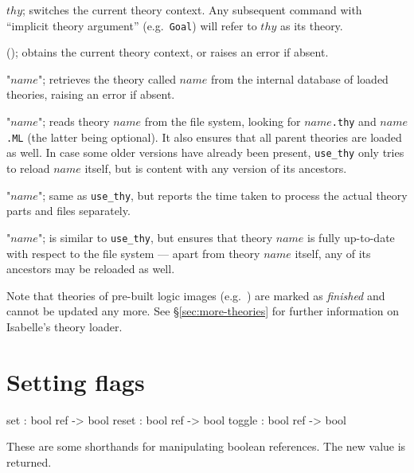 \begin{ttdescription}
  
\item[\ttindexbold{context} $thy$;] switches the current theory context.  Any
  subsequent command with ``implicit theory argument'' (e.g.\ \texttt{Goal})
  will refer to $thy$ as its theory.
  
\item[\ttindexbold{the_context}();] obtains the current theory context, or
  raises an error if absent.
  
\item[\ttindexbold{theory} "$name$";] retrieves the theory called $name$ from
  the internal database of loaded theories, raising an error if absent.
  
\item[\ttindexbold{use_thy} "$name$";] reads theory $name$ from the file
  system, looking for $name$\texttt{.thy} and $name$\texttt{.ML} (the latter
  being optional).  It also ensures that all parent theories are loaded as
  well.  In case some older versions have already been present,
  \texttt{use_thy} only tries to reload $name$ itself, but is content with any
  version of its ancestors.
  
\item[\ttindexbold{time_use_thy} "$name$";] same as \texttt{use_thy}, but
  reports the time taken to process the actual theory parts and {\ML} files
  separately.
  
\item[\ttindexbold{update_thy} "$name$";] is similar to \texttt{use_thy}, but
  ensures that theory $name$ is fully up-to-date with respect to the file
  system --- apart from theory $name$ itself, any of its ancestors may be
  reloaded as well.
  
\end{ttdescription}

Note that theories of pre-built logic images (e.g.\ {\HOL}) are marked as
\emph{finished} and cannot be updated any more.  See \S\ref{sec:more-theories}
for further information on Isabelle's theory loader.


\section{Setting flags}
\begin{ttbox}
set     : bool ref -> bool
reset   : bool ref -> bool
toggle  : bool ref -> bool
\end{ttbox}
These are some shorthands for manipulating boolean references.  The new
value is returned.


